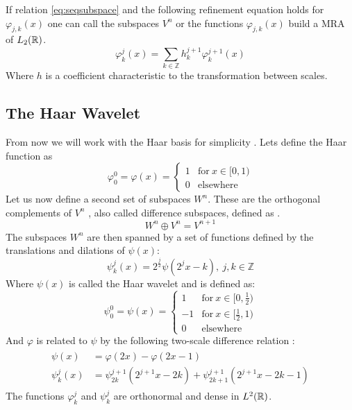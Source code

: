 \documentclass[../master_thesis.tex]{subfiles}
\begin{document}
If relation \ref{eq:seqsubspace} and the following refinement equation holds for $\varphi_{j,k}(x)$
one can call the subspaces $V^n$ or the functions $\varphi_{j,k}(x)$ build a \ac{MRA} of $L_2(\mathbb{R})$.
\begin{equation}
\varphi^j_k(x) = \sum_{k\in\mathbb{Z}} h^{j+1}_k\varphi^{j+1}_k(x)
\end{equation}
Where $h$ is a coefficient characteristic to the transformation between scales.
\subsection{The Haar Wavelet}
From now we will work with the Haar basis for simplicity \cite{Beylkin:MRA}.
Lets define the Haar function \cite{Schneider:2007} as
\begin{equation}
  \varphi^0_0 = \varphi(x) =
  \begin{cases}
  1 & \text{for} \ x\in [0,1)\\
  0 & \text{elsewhere}
\end{cases}
\end{equation}
Let us now define a second set of subspaces $W^n$. These are the orthogonal complements of $V^n$ \cite{Alpert1993}, also called difference subspaces,
defined as \cite{Beylkin:MRA, Sorland, Alpert1993}.
\begin{equation}
  W^n \oplus V^n = V^{n + 1} \label{eq:diffsubspace}
\end{equation}
The subspaces $W^n$ are then spanned by a set of functions defined by the translations and
dilations of $\psi(x)$:
\begin{equation}
  \psi_k^j(x) = 2^{\frac{j}{2}}\psi(2^jx - k),\  j,k \in \mathbb{Z} \label{eq:haarwavelet}
\end{equation}
Where $\psi(x)$ is called the Haar wavelet \cite{Schneider:2007} and is defined as:
\begin{equation}
  \psi^0_0 = \psi(x) =
  \begin{cases}
  1 & \text{for} \ x\in [0,\frac{1}{2})\\
  -1 & \text{for}\ x\in [\frac{1}{2}, 1)\\
  0 & \text{elsewhere}
\end{cases}
\end{equation}
And $ \varphi$ is related to $\psi$ by the following two-scale difference relation \cite{Beylkin:MRA, Schneider:2007, Sorland}:
\begin{align}
  \begin{split}\label{eq:2scalewavelet}
    \psi(x) &= \varphi(2x) - \varphi(2x - 1)\\
    \psi^j_k(x) &= \psi^{j+1}_{2k}(2^{j+1}x - 2k) + \psi^{j+1}_{2k+1}(2^{j+1}x - 2k - 1)
  \end{split}
\end{align}
The functions $\varphi^j_k$ and $\psi^j_k$ are orthonormal
and dense \cite{Beylkin:MRA, Sorland, SRJensen:2014} in $L^2(\mathbb{R})$.
\end{document}
